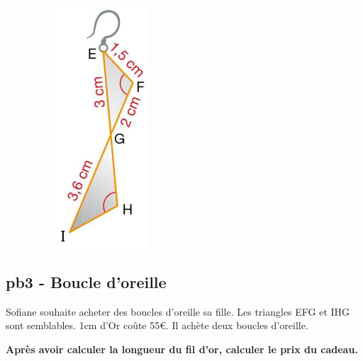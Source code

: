 \horrule{1px}

\begin{minipage}[t]{0.2\textwidth}
  \begin{figure}[H]
          \includegraphics[width=0.6\linewidth]{4x3-triangles-semblables/ie-pb3.png}
  \end{figure}
\end{minipage}
\begin{minipage}[t]{0.75\textwidth}
  \subsection*{pb3 - Boucle d'oreille}

  Sofiane souhaite acheter des boucles d'oreille sa fille. Les triangles EFG et IHG sont semblables. 1cm d'Or coûte 55€. Il achète deux boucles d'oreille.  

\textbf{Après avoir calculer la longueur du fil d'or, calculer le prix du cadeau. }
\end{minipage}


